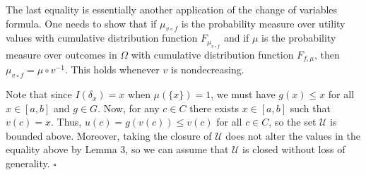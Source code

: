 \documentclass[12pt,a4paper]{article}
\newenvironment{original}
  {\par\noindent\color{black}\smallskip}
  {\par\smallskip}
\begin{document}
\begin{original}
The last equality is essentially another application of the change of variables formula. One needs to show that if $\mu_{v\circ f}$ is the probability measure over utility values with cumulative distribution function $F_{\mu_{v\circ f}}$ and if $\mu$ is the probability measure over outcomes in $\Omega$ with cumulative distribution function $F_{f,\mu}$, then $\mu_{v\circ f} = \mu \circ v^{-1}$. This holds whenever $v$ is nondecreasing.

Note that since $I(\delta_x) = x$ when $\mu(\{x\}) = 1$, we must have $g(x) \leq x$ for all $x \in [a, b]$ and $g \in G$. Now, for any $c \in C$ there exists $x \in [a,b]$ such that $v(c) = x$. Thus, $u(c) = g(v(c)) \leq v(c)$ for all $c \in C$, so the set $\mathcal{U}$ is bounded above. Moreover, taking the closure of $\mathcal{U}$ does not alter the values in the equality above by Lemma 3, so we can assume that $\mathcal{U}$ is closed without loss of generality. $\square$
\end{original}
\end{document}
